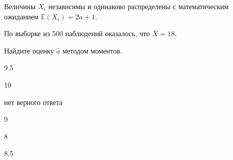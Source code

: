 
\begin{question}
Величины \(X_i\) независимы и одинаково распределены с математическим
ожиданием \(\mathbb{E}(X_i) = 2 a + 1\).

По выборке из 500 наблюдений оказалось, что \(\bar X = 18\).

Найдите оценку \(\hat a\) методом моментов.
\begin{answerlist}
  \item 9.5
  \item 10
  \item нет верного ответа
  \item 9
  \item 8
  \item 8.5
\end{answerlist}
\end{question}


